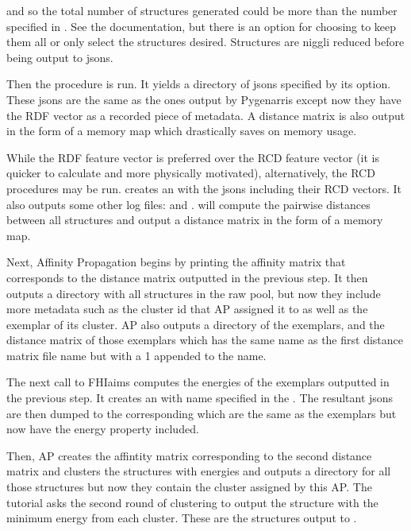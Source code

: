 \documentclass[letterpaper,10pt,english]{sphinxmanual}
\begin{document}
and so the total number of structures generated could
be more than the number specified in . See the documentation, but
there is an option for choosing to keep them all or only select
the  structures desired. Structures are niggli reduced
before being output to jsons.

Then the  procedure is run. It yields a directory of jsons
specified by its  option. These jsons are the same as the
ones output by Pygenarris except now they have the RDF vector as a recorded
piece of metadata. A distance matrix is also output in the form
of a memory map which drastically saves on memory usage.

While the RDF feature vector is preferred over the RCD feature vector (it is
quicker to calculate and more physically motivated), alternatively, the RCD
procedures may be run.  creates an  with the
jsons including their RCD vectors. It also outputs some other log files:
 and . 
will compute the pairwise distances between all structures and output a
distance matrix in the form of a memory map.

Next, Affinity Propagation begins by printing the affinity matrix that
corresponds to the distance matrix outputted in the previous step.
It then outputs a directory with all structures in the raw pool, but now they
include more metadata such as the cluster id that AP assigned
it to as well as the exemplar of its cluster. AP also outputs a directory of
the exemplars, and the distance matrix of those exemplars which has
the same name as the first distance matrix file name but with a 1 appended
to the name.

The next call to FHI\sphinxhyphen{}aims computes the energies of the exemplars outputted in
the previous step. It creates an  with name specified in
the . The resultant jsons are then dumped to the corresponding
 which are the same as the exemplars but now have the energy
property included.

Then, AP creates the affintity matrix corresponding to the second distance
matrix and clusters the structures with energies and outputs a directory
for all those structures but now they contain the cluster assigned by this AP.
The tutorial asks the second round of clustering to output the
structure with the minimum energy from each cluster. These are the structures
output to .
\end{document}
